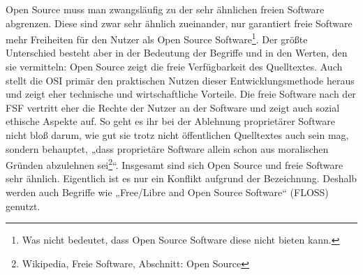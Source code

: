 \documentclass[a4paper,12pt]{article}
\begin{document}
Open Source muss man zwangsläufig zu der sehr ähnlichen freien Software abgrenzen. Diese sind zwar sehr ähnlich zueinander, nur garantiert freie Software mehr Freiheiten für den Nutzer als Open Source Software\footnote{Was nicht bedeutet, dass Open Source Software diese nicht bieten kann.}. Der größte Unterschied besteht aber in der Bedeutung der Begriffe und in den Werten, den sie vermitteln: Open Source zeigt die freie Verfügbarkeit des Quelltextes. Auch stellt die OSI primär den praktischen Nutzen dieser Entwicklungsmethode heraus und zeigt eher technische und wirtschaftliche Vorteile. Die freie Software nach der FSF vertritt eher die Rechte der Nutzer an der Software und zeigt auch sozial ethische Aspekte auf. So geht es ihr bei der Ablehnung proprietärer Software nicht bloß darum, wie gut sie trotz nicht öffentlichen Quelltextes auch sein mag, sondern behauptet, „dass proprietäre Software allein schon aus moralischen Gründen abzulehnen sei\footnote{Wikipedia, Freie Software, Abschnitt: Open Source}“. Insgesamt sind sich Open Source und freie Software sehr ähnlich. Eigentlich ist es nur ein Konflikt aufgrund der Bezeichnung. Deshalb werden auch Begriffe wie „Free/Libre and Open Source Software“ (FLOSS) genutzt.
\end{document}

